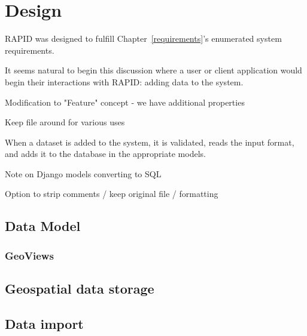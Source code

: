 \chapter{Design}
\label{design}

RAPID was designed to fulfill Chapter~\ref{requirements}'s enumerated system requirements.

It seems natural to begin this discussion where a user or client application would begin their interactions with RAPID: adding data to the system.



Modification to "Feature" concept - we have additional properties

Keep file around for various uses

When a dataset is added to the system, it is validated, reads the input format, and adds it to the database in the appropriate models.

Note on Django models converting to SQL

Option to strip comments / keep original file / formatting



\section{Data Model}



\subsection{GeoViews}


\label{design_srid}



\section{Geospatial data storage}

\section{Data import}